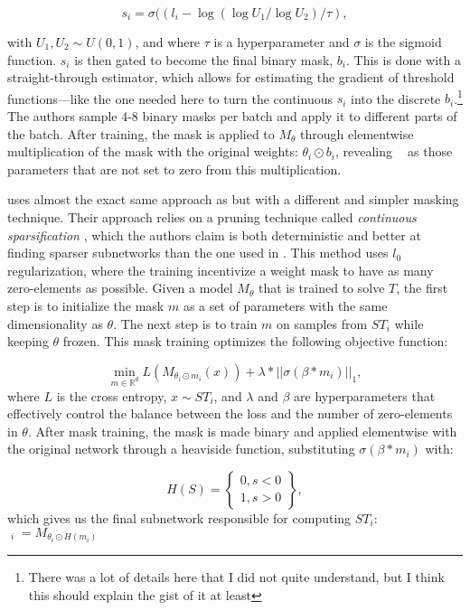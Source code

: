 \documentclass[11pt]{article}
\DeclareMathOperator*{\mini}{min}
\DeclareMathOperator*{\subnetwork}{\hat{\theta}}
\begin{document}
\begin{equation}
s_i = \sigma((l_i - \log(\log U_1 / \log U_2) / \tau),
\end{equation}

with $U_1, U_2 \sim U(0,1)$, and where $\tau$ is a hyperparameter and $\sigma$ is the sigmoid function. $s_i$ is then gated to become the final binary mask, $b_i$. This is done with a straight-through estimator, which allows for estimating the gradient of threshold functions---like the one needed here to turn the continuous $s_i$ into the discrete $b_i$.\footnote{There was a lot of details here that I did not quite understand, but I think this should explain the gist of it at least} The authors sample 4-8 binary masks per batch and apply it to different parts of the batch. After training, the mask is applied to $M_\theta$ through elementwise multiplication of the mask with the original weights: $\theta_i \odot b_i$, revealing $\subnetwork$ as those parameters that are not set to zero from this multiplication.

\citet{lepori2023break} uses almost the exact same approach as \citet{csordas2020neural} but with a different and simpler masking technique. Their approach relies on a pruning technique called \textit{continuous sparsification} \citep{savarese2020winning}, which the authors claim is both deterministic and better at finding sparser subnetworks than the one used in \citet{csordas2020neural}. This method uses $l_0$ regularization, where the training incentivize a weight mask to have as many zero-elements as possible. Given a model $M_\theta$ that is trained to solve $T$, the first step is to initialize the mask $m$ as a set of parameters with the same dimensionality as $\theta$. The next step is to train $m$ on samples from $ST_i$ while keeping $\theta$ frozen. This mask training optimizes the following objective function: 

\begin{equation}
\mini_{m \in \mathbb{R}^d} L (M_{\theta_i \odot m_i}(x)) + \lambda * ||\sigma(\beta * m_i)||_1,
\end{equation}
where $L$ is the cross entropy, $x \sim ST_i$, and $\lambda$ and $\beta$ are hyperparameters that effectively control the balance between the loss and the number of zero-elements in $\theta$. After mask training, the mask is made binary and applied elementwise with the original network through a heaviside function, substituting $\sigma(\beta * m_i)$ with:

\begin{equation}
    H(S)=
    \left\{
    \begin{array}{lr}
      0,  s < 0 \\
      1,  s > 0
    \end{array}
    \right\},
\end{equation}
which gives us the final subnetwork responsible for computing $ST_i$: $\subnetwork_i = M_{\theta_i \odot H(m_i)}$
\end{document}
